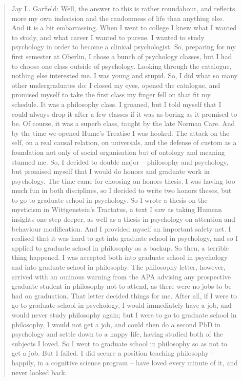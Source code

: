 \documentclass[article,letterpaper,times,12pt,listings-bw,microtype]{memoir}
\begin{document}
\begin{quote}
Jay L. Garfield: Well, the answer to this is rather roundabout, and reflects more my own indecision and the randomness of life than anything else. And it is a bit embarrassing. When I went to college I knew what I wanted to study, and what career I wanted to pursue. I wanted to study psychology in order to become a clinical psychologist. So, preparing for my first semester at Oberlin, I chose a bunch of psychology classes, but I had to choose one class outside of psychology. Looking through the catalogue, nothing else interested me. I was young and stupid. So, I did what so many other undergraduates do: I closed my eyes, opened the catalogue, and promised myself to take the first class my finger fell on that fit my schedule. It was a philosophy class. I groaned, but I told myself that I could always drop it after a few classes if it was as boring as it promised to be. Of course, it was a superb class, taught by the late Norman Care. And by the time we opened Hume’s Treatise I was hooked. The attack on the self, on a real causal relation, on universals, and the defense of custom as a foundation not only of social organisation but of ontology and meaning stunned me. So, I decided to double major – philosophy and psychology, but promised myself that I would do honors and graduate work in psychology. The time came for choosing an honors thesis. I was having too much fun in both disciplines, so I decided to write two honors theses, but to go to graduate school in psychology. So I wrote a thesis on the mysticism in Wittgenstein’s Tractatus, a text I saw as taking Humean insights one step deeper, as well as a thesis in psychology on attention and behaviour modification. And I provided myself an important safety net. I realised that it was hard to get into graduate school in psychology, and so I applied to graduate school in philosophy as a backup. So then, a terrible thing happened. I was accepted both into graduate school in psychology and into graduate school in philosophy. The philosophy letter, however, arrived with an ominous warning from the APA advising any prospective graduate student in philosophy not to attend, as there were no jobs to be had on graduation. That letter decided things for me. After all, if I were to go to graduate school in psychology, I would immediately have a job, and would never study philosophy again; but I were to go to graduate school in philosophy, I would not get a job, and could then do a second PhD in psychology and settle down to a happy life, having studied both of the subjects I loved. So I went to graduate school in philosophy so as not to get a job. But I failed. I did secure a position teaching philosophy – happily, in a cognitive science program – have loved every minute of it, and never looked back.
\end{quote}
\end{document}
